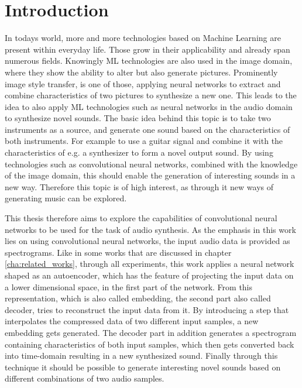 \chapter{Introduction}
\label{cha:Introduction}

In todays world, more and more technologies based on Machine Learning are present within everyday life. Those grow in their applicability and already span numerous fields. Knowingly ML technologies are also used in the image domain, where they show the ability to alter but also generate pictures. Prominently image style transfer, is one of those, applying neural networks to extract and combine characteristics of two pictures to synthesize a new one. This leads to the idea to also apply ML technologies such as neural networks in the audio domain to synthesize novel sounds. The basic idea behind this topic is to take two instruments as a source, and generate one sound based on the characteristics of both instruments. For example to use a guitar signal and combine it with the characteristics of e.g. a synthesizer to form a novel output sound. By using technologies such as convolutional neural networks, combined with the knowledge of the image domain, this should enable the generation of interesting sounds in a new way. Therefore this topic is of high interest, as through it new ways of generating music can be explored. 

This thesis therefore aims to explore the capabilities of convolutional neural networks to be used for the task of audio synthesis. As the emphasis in this work lies on using convolutional neural networks, the input audio data is provided as spectrograms. Like in some works that are discussed in chapter \ref{cha:related_works}, through all experiments, this work applies a neural network shaped as an autoencoder, which has the feature of projecting the input data on a lower dimensional space, in the first part of the network. From this representation, which is also called embedding, the second part also called decoder, tries to reconstruct the input data from it. By introducing a step that interpolates the compressed data of two different input samples, a new embedding gets generated. The decoder part in addition generates a spectrogram containing characteristics of both input samples, which then gets converted back into time-domain resulting in a new synthesized sound. Finally through this technique it should be possible to generate interesting novel sounds based on different combinations of two audio samples.

\newpage

